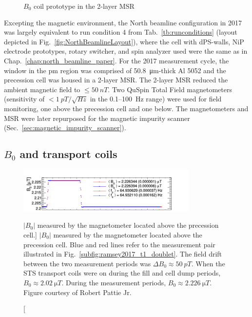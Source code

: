 \begin{figure}[hb]
\begin{minipage}{.45\textwidth}
    \caption
    {$B_0$ coil prototype in the 2-layer MSR}
    \label{fig:ramsey_2017_B0_coil_prototype}
\end{minipage}
\end{figure}

Excepting the magnetic environment, the North beamline configuration in 2017 was largely equivalent to run condition 4 from Tab.~\ref{tb:runconditions} (layout depicted in Fig.~\ref{fig:NorthBeamlineLayout}), where the cell with dPS-walls, NiP electrode prototypes, rotary switcher, and spin analyzer used were the same as in Chap.~\ref{chap:north_beamline_paper}. For the 2017 measurement cycle, the window in the \acrshort{pm} region was comprised of \qty{50.8}{\micro\meter}-thick Al 5052 and the precession cell was housed in a 2-layer MSR. The 2-layer MSR reduced the ambient magnetic field to $\leq \qty{50}{nT}$. Two QuSpin Total Field magnetometers (sensitivity of $<\qty{1}{pT\per\sqrt{Hz}}$ in the 0.1--\qty{100}{\hertz} range) were used for field monitoring, one above the precession cell and one below. The magnetometers and MSR were later repurposed for the magnetic impurity scanner (Sec.~\ref{sec:magnetic_impurity_scanner}).


\subsection
{
    \texorpdfstring{$B_0$ and transport coils}
                    {B0 and transport coils}
}


\begin{figure}
    \centering
    \includegraphics[width=0.8\textwidth]{figures/ramsey2017_B0.png}
    \caption
    [$|B_0|$ measured by the magnetometer located above the precession cell.]
    {$|B_0|$ measured by the magnetometer located above the precession cell. Blue and red lines refer to the measurement pair illustrated in Fig.~\ref{subfig:ramsey2017_t1_doublet}. The field drift between the two measurement periods was $\Delta B_0\approx\qty{50}{pT}$. When the STS transport coils were on during the fill and cell dump periods, $B_0\approx\qty{2.02}{\micro T}$.  During the measurement periods, $B_0\approx\qty{2.226}{\micro T}$. Figure courtesy of Robert Pattie Jr.}
    \label{fig:ramsey_2017_b0_map}
\end{figure}

